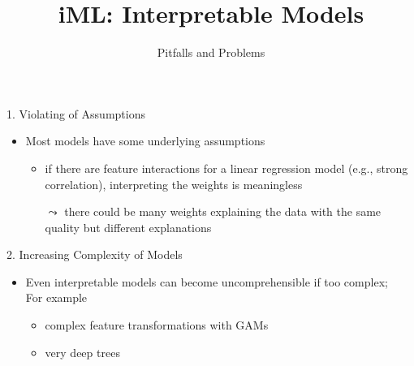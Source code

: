 \documentclass[aspectratio=169]{../latex_main/tntbeamer}  %
\title[Introduction]{iML: Interpretable Models}
\subtitle{Pitfalls and Problems}
\begin{document}
	
	\maketitle

    
    \begin{frame}[c]{1. Violating of Assumptions}
    
        \begin{itemize}
            \item Most models have some underlying assumptions
            \begin{itemize}
                \item if there are feature interactions for a linear regression model (e.g., strong correlation), interpreting the weights is meaningless
                \item[$\leadsto$] there could be many weights explaining the data with the same quality but different explanations
            \end{itemize}
        \end{itemize}
    
    \end{frame}
    
    
    \begin{frame}[c]{2. Increasing Complexity of Models}
    
        \begin{itemize}
            \item Even interpretable models can become uncomprehensible if too complex;\\
            For example
            \begin{itemize}
                \item complex feature transformations with GAMs
                \item very deep trees
            \end{itemize}
            
        \end{itemize}
    
    \end{frame}
    
    
\end{document}
